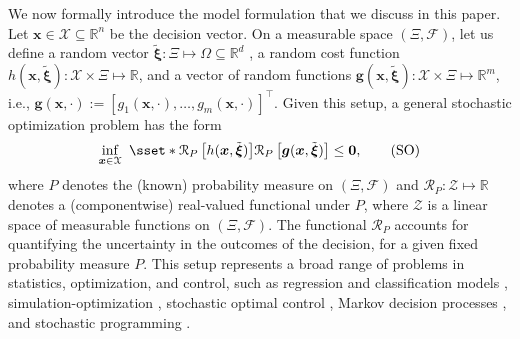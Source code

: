 \documentclass[final,onefignum,onetabnum]{class}
\newcommand{\rrisk}[2]{\Cs{R}_{#1} \left[ #2 \right]}
\newcommand{\bs}[1]{\boldsymbol{#1}} %
\newcommand{\Bs}[1]{\mathbb{#1}} %
\newcommand{\Cs}[1]{\mathcal{#1}} %
\newcommand{\Fs}[1]{\mathfrak{#1}} %
\newcommand{\txi}{\tilde{\bs{\xi}}}
\newcommand{\measurespace}{\left( \Xi, \Cs{F} \right)}
\newcommand{\probspace}[1]{\left( \Bs{R}^{#1}, \Fs{B}(\Bs{R}^{#1}) \right)}
\newcommand{\M}{\Fs{M}_{+}(\Xi,\Cs{F})}
\renewcommand{\P}{\Fs{P}(\Bs{R}^{d},\Fs{B}(\Bs{R}^{d}))}
\begin{document}
We  now formally introduce the model formulation that we discuss in this paper. Let $\bs{x} \in \Cs{X} \subseteq \Bs{R}^{n}$ be the decision vector.  On a measurable space $\measurespace$, let us define a random vector $\txi: \Xi \mapsto \Omega \subseteq \Bs{R}^{d}$%
, a random cost function $h(\bs{x},\txi): \Cs{X} \times \Xi \mapsto \Bs{R}$, and a vector of random functions $\bs{g}(\bs{x},\txi): \Cs{X} \times \Xi \mapsto \Bs{R}^{m}$, i.e., $\bs{g}(\bs{x}, \cdot):=[g_1(\bs{x}, \cdot),\ldots,g_m(\bs{x}, \cdot)]^{\top}$. %
Given this setup, a general stochastic optimization problem has the form 
\begin{equation}
\label{eq: SO}
\inf_{\bs{x} \in \Cs{X} } \ \sset*{\rrisk{P} {h(\bs{x},\txi)}}{\rrisk{P}{\bs{g}(\bs{x},\txi)} \le \bs{0}}, \tag{\text{SO}}
\end{equation}
where $P$ denotes  the (known)  probability measure on $\measurespace$ %
and $\Cs{R}_{P}: \Cs{Z} \mapsto \Bs{R}$ denotes a (componentwise)  real-valued functional  under $P$, where $\Cs{Z}$ is a linear space of measurable functions on $\measurespace$. The functional $\Cs{R}_{P}$ accounts for quantifying the uncertainty in the outcomes of the decision, for a given fixed probability measure $P$. 
This setup represents a broad range of problems in statistics, optimization, and control, such as regression and classification models \cite{friedman2016SL,james2013SL}, simulation-optimization \cite{fu2016SO,pasupathy2013SO}, stochastic optimal control \cite{bertsekas1995DP}, Markov decision processes \cite{puterman2005MDP}, and stochastic programming \cite{birge2011SP,shapiro2014SP}.  
\end{document}
